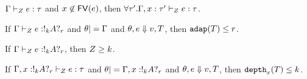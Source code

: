   
  \begin{thm}
   $\Gamma \vdash_{Z} e: \tau$ and $ x \not \in \mathsf{FV} (e)
   $, then  $\forall \tau'. \Gamma, x: \tau' \vdash_{Z} e: \tau  $. 
   \end{thm}

\begin{thm}
  If  $\Gamma \vdash_{Z} e: !_{k} A ?_{r} $ and
  $\theta |= \Gamma$ and  $\theta, e \mathrel{\Downarrow}
  v, T$, then $\mathtt{adap}(T) \leq r $. 
\end{thm}

\begin{thm}
  If  $\Gamma \vdash_{Z} e: !_{k} A ?_{r} $,
  then $Z \geq k$.
   \end{thm}

 \begin{thm}
  If  $\Gamma, x: !_{k} A ?_{r} \vdash_{Z} e: \tau$ and
  $\theta |= \Gamma, x: !_{k} A ?_{r}$ and  $\theta, e \mathrel{\Downarrow}
  v, T$, then $\mathtt{depth}_{x}(T) \leq k$. 
   \end{thm}